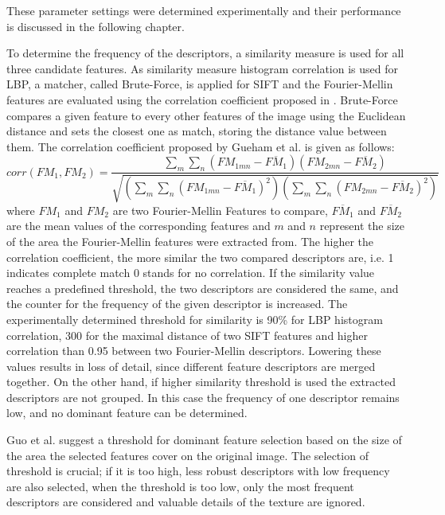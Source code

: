 \documentclass[draft,final]{vutinfth} %
\begin{document}
These parameter settings were determined experimentally and their performance is discussed in the following chapter.
\par
To determine the frequency of the descriptors, a similarity measure is used for all three candidate features. 
As similarity measure histogram correlation is used for LBP, a matcher, called Brute-Force, is applied for SIFT and the Fourier-Mellin features are evaluated using the correlation coefficient proposed in \cite{gueham2008automatic}.
Brute-Force compares a given feature to every other features of the image using the Euclidean distance and sets the closest one as match, storing the distance value between them.
The correlation coefficient proposed by Gueham et al. \cite{gueham2008automatic} is given as follows:
\begin{equation}
corr(FM_{1},FM_{2}) = \frac{\sum\limits_{m}\sum\limits_{n}(FM_{1mn}-\overline{FM_{1}})(FM_{2mn}-\overline{FM_{2}})}{\sqrt{(\sum\limits_{m}\sum\limits_{n}(FM_{1mn}-\overline{FM_{1}})^2)(\sum\limits_{m}\sum\limits_{n}(FM_{2mn}-\overline{FM_{2}})^2)}}  
\label{FMcorr}
\end{equation}
where $FM_{1}$ and $FM_{2}$ are two Fourier-Mellin Features to compare, $\overline{FM_{1}}$ and $\overline{FM_{2}}$ are the mean values of the corresponding features and $m$ and $n$ represent the size of the area the Fourier-Mellin features were extracted from.
The higher the correlation coefficient, the more similar the two compared descriptors are, i.e. 1 indicates complete match 0 stands for no correlation.
If the similarity value reaches a predefined threshold, the two descriptors are considered the same, and the counter for the frequency of the given descriptor is increased.
The experimentally determined threshold for similarity is  90\% for LBP histogram correlation, 300 for the maximal distance of two SIFT features and higher correlation than 0.95 between two Fourier-Mellin descriptors. 
Lowering these values results in loss of detail, since different feature descriptors are merged together.
On the other hand, if higher similarity threshold is used the extracted descriptors are not grouped.
In this case the frequency of one descriptor remains low, and no dominant feature can be determined.
\par
Guo et al. \cite{guo2012discriminative} suggest a threshold for dominant feature selection based on the size of the area the selected features cover on the original image.
The selection of threshold is crucial; if it is too high, less robust descriptors with low frequency are also selected, when the threshold is too low, only the most frequent descriptors are considered and valuable details of the texture are ignored. 
\end{document}
